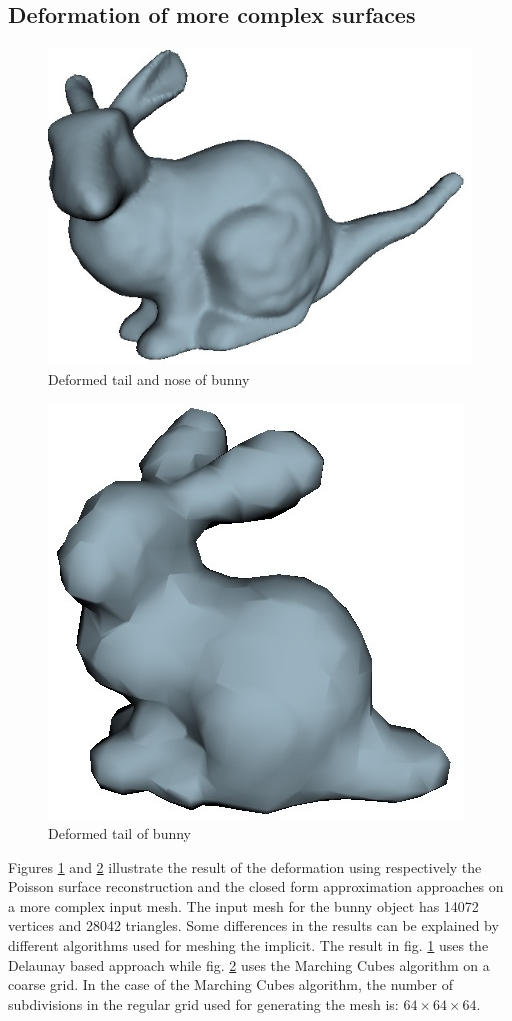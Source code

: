\documentclass[ams]{U-AizuGT}
\begin{document}
\subsection{Deformation of more complex surfaces}
\begin{figure}
  \centering\includegraphics[width=0.7\columnwidth]{deformed_bunny_poisson.jpg}
  \caption{Deformed tail and nose of bunny} \label{fig:bunnyPoisson}
\end{figure}
\begin{figure}
  \centering\includegraphics[width=0.7\columnwidth]{deformed_bunny_hrbfclosed.jpg}
  \caption{Deformed tail of bunny} \label{fig:bunnyHrbfclosed}
\end{figure}
Figures \ref{fig:bunnyPoisson} and \ref{fig:bunnyHrbfclosed} illustrate the result of the deformation 
using respectively the Poisson surface reconstruction and the closed form approximation approaches 
on a more complex input mesh.
The input mesh for the bunny object has 14072 vertices and 28042 triangles.
Some differences in the results can be explained by different algorithms used for meshing the implicit. 
The result in fig. \ref{fig:bunnyPoisson} uses the Delaunay based approach while fig. \ref{fig:bunnyHrbfclosed}
uses the Marching Cubes algorithm on a coarse grid. 
In the case of the Marching Cubes algorithm, 
the number of subdivisions in the regular grid used for generating the mesh is: 
$64\times 64\times 64$.
\end{document}

